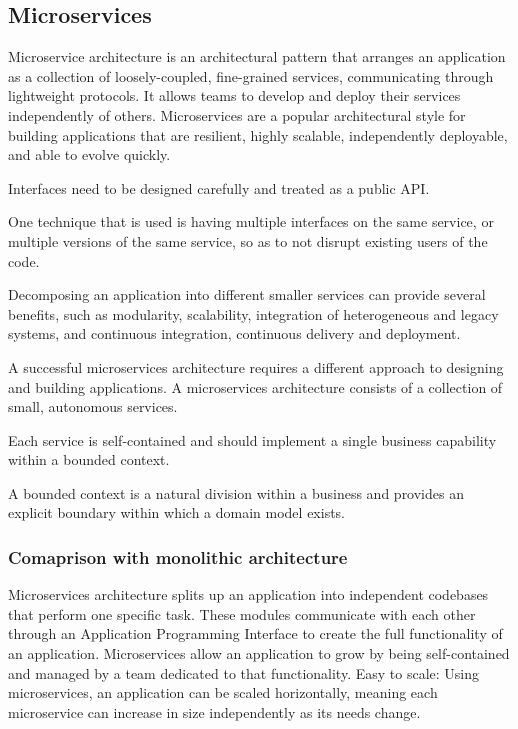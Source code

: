 \documentclass[conference]{IEEEtran}
\begin{document}
\subsection{Microservices}

Microservice architecture is an architectural pattern that arranges an application as a collection of loosely-coupled, fine-grained services, communicating through lightweight protocols. It allows teams to develop and deploy their services independently of others. Microservices are a popular architectural style for building applications that are resilient, highly scalable, independently deployable, and able to evolve quickly.

Interfaces need to be designed carefully and treated as a public API.

One technique that is used is having multiple interfaces on the same service, or multiple versions of the same service, so as to not disrupt existing users of the code. \cite{b3}

Decomposing an application into different smaller services can provide several benefits, such as modularity, scalability, integration of heterogeneous and legacy systems, and continuous integration, continuous delivery and deployment.

A successful microservices architecture requires a different approach to designing and building applications.
A microservices architecture consists of a collection of small, autonomous services.

Each service is self-contained and should implement a single business capability within a bounded context.

A bounded context is a natural division within a business and provides an explicit boundary within which a domain model exists.

\subsubsection{Comaprison with monolithic architecture}

Microservices architecture splits up an application into independent codebases that perform one specific task. These modules communicate with each other through an Application Programming Interface to create the full functionality of an application.
Microservices allow an application to grow by being self-contained and managed by a team dedicated to that functionality.
Easy to scale: Using microservices, an application can be scaled horizontally, meaning each microservice can increase in size independently as its needs change.
\end{document}
